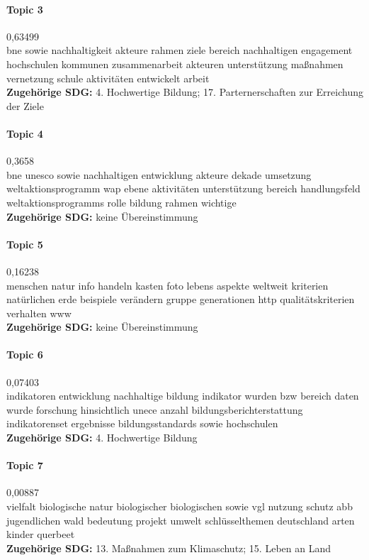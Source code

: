 \documentclass[a4paper,11pt]{article}
\begin{document}
\paragraph{Topic 3} 0,63499 \\
bne sowie nachhaltigkeit akteure rahmen ziele bereich nachhaltigen engagement
hochschulen kommunen zusammenarbeit akteuren unterstützung maßnahmen
vernetzung schule aktivitäten entwickelt arbeit   \\ 
\textbf{Zugehörige SDG:} 4. Hochwertige Bildung; 17. Parternerschaften zur
Erreichung der Ziele 

\paragraph{Topic 4} 0,3658 \\
bne unesco sowie nachhaltigen entwicklung akteure dekade umsetzung
weltaktionsprogramm wap ebene aktivitäten unterstützung bereich handlungsfeld
weltaktionsprogramms rolle bildung rahmen wichtige    \\ 
\textbf{Zugehörige SDG:} keine Übereinstimmung
  
\paragraph{Topic 5} 0,16238 \\
menschen natur info handeln kasten foto lebens aspekte weltweit kriterien
natürlichen erde beispiele verändern gruppe generationen http
qualitätskriterien verhalten www   \\ 
\textbf{Zugehörige SDG:} keine Übereinstimmung
    
\paragraph{Topic 6} 0,07403 \\
indikatoren entwicklung nachhaltige bildung indikator wurden bzw bereich daten
wurde forschung hinsichtlich unece anzahl bildungsberichterstattung
indikatorenset ergebnisse bildungsstandards sowie hochschulen    \\
 \textbf{Zugehörige SDG:} 4. Hochwertige Bildung 
 
 
\paragraph{Topic 7} 0,00887 \\
vielfalt biologische natur biologischer biologischen sowie vgl nutzung schutz
abb jugendlichen wald bedeutung projekt umwelt schlüsselthemen deutschland
arten kinder querbeet    \\ 
\textbf{Zugehörige SDG:} 13. Maßnahmen zum Klimaschutz; 15. Leben an Land 
\end{document}
